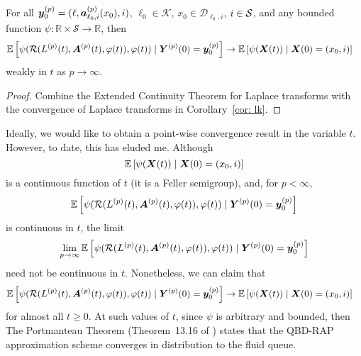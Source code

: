 \begin{thm}\label{thm: big thm}
	For all \(\boldsymbol y_0^{(p)}=(\ell,\boldsymbol a_{\ell_0,i}^{(p)}(x_0),i)\), \(\ell_0\in\mathcal K\), \(x_0\in\mathcal D_{\ell_0,i}\), \(i\in\mathcal{S}\), and any bounded function \(\psi:\mathbb R\times \mathcal S \to \mathbb R\), then
	\begin{align}
			&\mathbb E\left[\psi( \mathcal R(L^{(p)}(t),\boldsymbol A^{(p)}(t),\varphi(t)),\varphi(t) )   \mid \boldsymbol Y^{(p)}(0)=\boldsymbol y_0^{(p)} \right] \nonumber 
			\to \mathbb E\left[\psi({\boldsymbol X}(t))\mid \boldsymbol X(0)=(x_0, i) \right] \nonumber
	\end{align}
	weakly in \(t\) as \(p\to \infty\). 
\end{thm}
\begin{proof}
	Combine the Extended Continuity Theorem for Laplace transforms \cite[Chapter XIII, Theorem 2a]{feller1957} with the convergence of Laplace transforms in Corollary~\ref{cor: lk}. 
\end{proof}

Ideally, we would like to obtain a point-wise convergence result in the variable \(t\). However, to date, this has eluded me. Although 
\[\mathbb E\left[\psi({\boldsymbol X}(t))\mid \boldsymbol X(0)=(x_0,i) \right]\] 
is a continuous function of \(t\) (it is a Feller semigroup), and, for \(p<\infty\), 
\[\mathbb E\left[\psi( \mathcal R(L^{(p)}(t),\boldsymbol A^{(p)}(t),\varphi(t)),\varphi(t) )   \mid \boldsymbol Y^{(p)}(0)=\boldsymbol y_0^{(p)} \right]  \]
 is continuous in \(t\), the limit 
 \[\lim\limits_{p\to\infty}\mathbb E\left[\psi( \mathcal R(L^{(p)}(t),\boldsymbol A^{(p)}(t),\varphi(t)),\varphi(t) ) \mid \boldsymbol Y^{(p)}(0)=\boldsymbol y_0^{(p)}\right]  \] need not be continuous in \(t\). Nonetheless, we can claim that 
\begin{align}
		&\mathbb E\left[\psi( \mathcal R(L^{(p)}(t),\boldsymbol A^{(p)}(t),\varphi(t)),\varphi(t) )    \mid \boldsymbol Y^{(p)}(0)=\boldsymbol y_0^{(p)}\right]  \nonumber
		\to \mathbb E\left[\psi({\boldsymbol X}(t) )\mid \boldsymbol X(0)=(x_0, i) \right] \nonumber
\end{align}
for almost all \(t\geq 0\). At such values of \(t\), since \(\psi\) is arbitrary and bounded, then The Portmanteau Theorem (Theorem~13.16 of \cite{portmanteaubook}) states that the QBD-RAP approximation scheme converges in distribution to the fluid queue.

